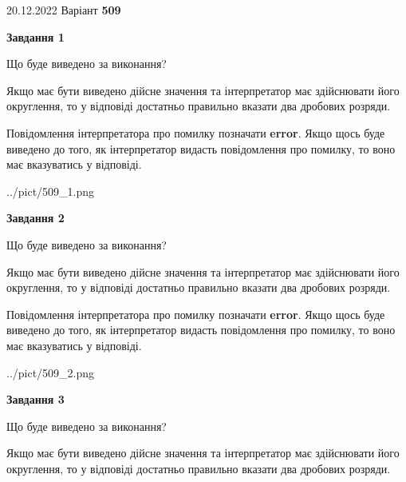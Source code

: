 \documentclass[12pt, ukrainian]{article}
\begin{document}
{20.12.2022 Варіант \No \textbf { 509 }\par}
{
\begin {Large}

{\begin {center}\textbf{Завдання 1}\end {center}}\par
Що буде виведено за виконання? \par

Якщо має бути виведено дійсне значення та інтерпретатор має здійснювати його округлення, 
то у відповіді достатньо правильно вказати два дробових розряди.

Повідомлення інтерпретатора про помилку позначати \textbf{error}.
Якщо щось буде виведено до того, як інтерпретатор видасть повідомлення про помилку, 
то воно має вказуватись у відповіді. \par

\begin{center}
	{../pict/509_1.png}
\end{center}
\newpage

{\begin {center}\textbf{Завдання 2}\end {center}}\par
Що буде виведено за виконання? \par

Якщо має бути виведено дійсне значення та інтерпретатор має здійснювати його округлення, 
то у відповіді достатньо правильно вказати два дробових розряди.

Повідомлення інтерпретатора про помилку позначати \textbf{error}.
Якщо щось буде виведено до того, як інтерпретатор видасть повідомлення про помилку, 
то воно має вказуватись у відповіді. \par

\begin{center}
	{../pict/509_2.png}
\end{center}
\newpage

{\begin {center}\textbf{Завдання 3}\end {center}}\par
Що буде виведено за виконання? \par

Якщо має бути виведено дійсне значення та інтерпретатор має здійснювати його округлення, 
то у відповіді достатньо правильно вказати два дробових розряди.


\end{Large}}
\end{document}
